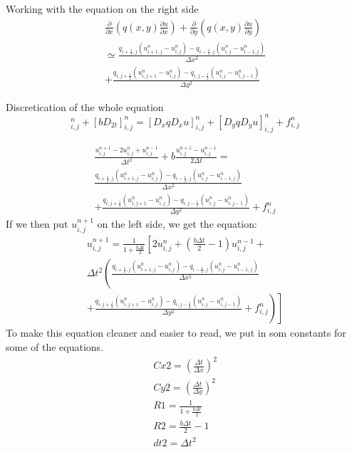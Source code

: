 \documentclass[norsk,11pt,a4paper]{article}
\begin{document}
Working with the equation on the right side
\begin{equation}
\begin{aligned}
 \frac{\partial}{\partial x}\left(q(x,y)\frac{\partial u}{\partial x}\right)+ \frac{\partial}{\partial y}\left(q(x,y)\frac{\partial u}{\partial y}\right)\\
\simeq \frac{q_{i+\frac{1}{2},j}(u^n_{i+1,j}-u^n_{i,j})-q_{i-\frac{1}{2},j}(u^n_{i,j}-u^n_{i-1,j})}{\Delta x^2}\\
+ \frac{q_{i,j+\frac{1}{2}}(u^n_{i,j+1}-u^n_{i,j})-q_{i,j-\frac{1}{2}}(u^n_{i,j}-u^n_{i,j-1})}{\Delta y^2}
\end{aligned}
\end{equation}

Discretication of the whole equation
\begin{equation}
[D_tD_tu]^n_{i,j} + [bD_{2t}]^n_{i,j} = [D_xqD_xu]^n_{i,j} + [D_yqD_yu]^n_{i,j} + f^n_{i,j}
\end{equation}

\begin{equation}
\begin{aligned}
\frac{u^{n+1}_{i,j}-2u^{n}_{i,j}+u^{n-1}_{i,j}}{\Delta t^2} + b\frac{u^{n+1}_{i,j}-u^{n-1}_{i,j}}{2\Delta t} =  \\
\frac{q_{i+\frac{1}{2},j}(u^n_{i+1,j}-u^n_{i,j})-q_{i-\frac{1}{2},j}(u^n_{i,j}-u^n_{i-1,j})}{\Delta x^2} \\
+ \frac{q_{i,j+\frac{1}{2}}(u^n_{i,j+1}-u^n_{i,j})-q_{i,j-\frac{1}{2}}(u^n_{i,j}-u^n_{i,j-1})}{\Delta y^2} + f^n_{i,j}
\end{aligned}
\end{equation}
If we then put $u^{n+1}_{i,j}$ on the left side, we get the equation:
\begin{equation}
\begin{aligned}
u^{n+1}_{i,j} = \frac{1}{1+\frac{b\Delta t}{2}}\left[ 2u^n_{i,j}+(\frac{b\Delta t}{2}-1)u^{n-1}_{i,j} + \right.\\
\left.\Delta t^2\left(\frac{q_{i+\frac{1}{2},j}(u^n_{i+1,j}-u^n_{i,j})-q_{i-\frac{1}{2},j}(u^n_{i,j}-u^n_{i-1,j})}{\Delta x^2}\right.\right. \\
+ \left.\left.\frac{q_{i,j+\frac{1}{2}}(u^n_{i,j+1}-u^n_{i,j})-q_{i,j-\frac{1}{2}}(u^n_{i,j}-u^n_{i,j-1})}{\Delta y^2} + f^n_{i,j}\right)\right]
\end{aligned}
\end{equation}
To make this equation cleaner and easier to read, we put in som constants for some of the equations.
\begin{equation}
\begin{aligned}
Cx2 = \left(\frac{\Delta t}{\Delta x}\right)^2 \\
Cy2 = \left(\frac{\Delta t}{\Delta y}\right)^2 \\
R1 = \frac{1}{1+\frac{b \Delta t}{2}} \\
R2 = \frac{b \Delta t}{2} - 1 \\
dt2 = \Delta t^2
\end{aligned}
\end{equation}
\end{document}

